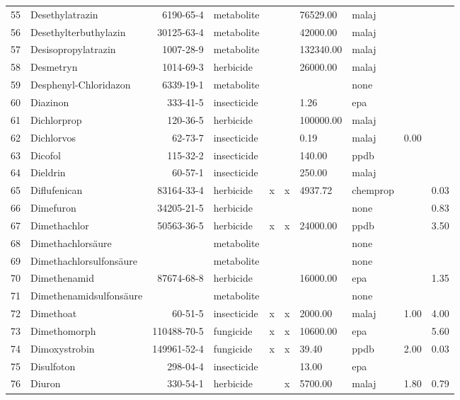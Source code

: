 \begin{longtable}{lp{3cm}rlp{0.5cm}p{0.5cm}p{1.5cm}p{1cm}p{1cm}p{1cm}}
  55 & Desethylatrazin & 6190-65-4 & metabolite &  &  & 76529.00 & malaj &  &  \\ 
  56 & Desethylterbuthylazin & 30125-63-4 & metabolite &  &  & 42000.00 & malaj &  &  \\ 
  57 & Desisopropylatrazin & 1007-28-9 & metabolite &  &  & 132340.00 & malaj &  &  \\ 
  58 & Desmetryn & 1014-69-3 & herbicide &  &  & 26000.00 & malaj &  &  \\ 
  59 & Desphenyl-Chloridazon & 6339-19-1 & metabolite &  &  &  & none &  &  \\ 
  60 & Diazinon & 333-41-5 & insecticide &  &  & 1.26 & epa &  &  \\ 
  61 & Dichlorprop & 120-36-5 & herbicide &  &  & 100000.00 & malaj &  &  \\ 
  62 & Dichlorvos & 62-73-7 & insecticide &  &  & 0.19 & malaj & 0.00 &  \\ 
  63 & Dicofol & 115-32-2 & insecticide &  &  & 140.00 & ppdb &  &  \\ 
  64 & Dieldrin & 60-57-1 & insecticide &  &  & 250.00 & malaj &  &  \\ 
  65 & Diflufenican & 83164-33-4 & herbicide & x & x & 4937.72 & chemprop &  & 0.03 \\ 
  66 & Dimefuron & 34205-21-5 & herbicide &  &  &  & none &  & 0.83 \\ 
  67 & Dimethachlor & 50563-36-5 & herbicide & x & x & 24000.00 & ppdb &  & 3.50 \\ 
  68 & Dimethachlorsäure &  & metabolite &  &  &  & none &  &  \\ 
  69 & Dimethachlorsulfonsäure &  & metabolite &  &  &  & none &  &  \\ 
  70 & Dimethenamid & 87674-68-8 & herbicide &  &  & 16000.00 & epa &  & 1.35 \\ 
  71 & Dimethenamidsulfonsäure &  & metabolite &  &  &  & none &  &  \\ 
  72 & Dimethoat & 60-51-5 & insecticide & x & x & 2000.00 & malaj & 1.00 & 4.00 \\ 
  73 & Dimethomorph & 110488-70-5 & fungicide & x & x & 10600.00 & epa &  & 5.60 \\ 
  74 & Dimoxystrobin & 149961-52-4 & fungicide & x & x & 39.40 & ppdb & 2.00 & 0.03 \\ 
  75 & Disulfoton & 298-04-4 & insecticide &  &  & 13.00 & epa &  &  \\ 
  76 & Diuron & 330-54-1 & herbicide &  & x & 5700.00 & malaj & 1.80 & 0.79 \\ 

\end{longtable}
